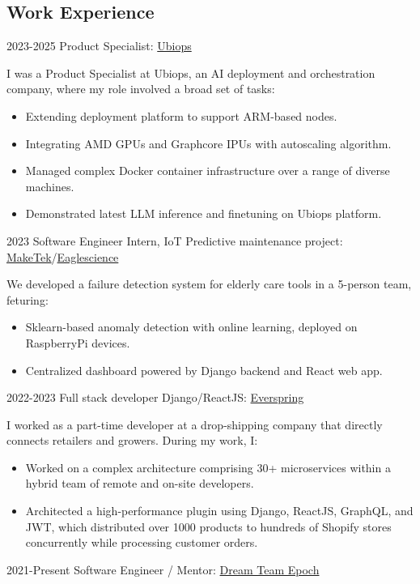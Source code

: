 \documentclass{article}
\begin{document}
\subsection{Work Experience}

\cvitem
{2023-2025}
{Product Specialist:}
{ \href{https://ubiops.com/}{Ubiops}}
{
I was a Product Specialist at Ubiops, an AI deployment and orchestration company, where my role involved a broad set of tasks: 
\begin{itemize}
\item Extending deployment platform to support ARM-based nodes. 
\item Integrating AMD GPUs and Graphcore IPUs with autoscaling algorithm. 
\item Managed complex Docker container infrastructure over a range of diverse machines. 
\item Demonstrated latest LLM inference and finetuning on Ubiops platform.
\end{itemize}
}
\cvitem
{2023}
{Software Engineer Intern, IoT Predictive maintenance project:}
{ \href{https://www.maketek.nl/}{MakeTek}/\href{https://www.eaglescience.nl/}{Eaglescience}}
{We developed a failure detection system for elderly care tools in a 5-person team, feturing:
\begin{itemize}
\item Sklearn-based anomaly detection with online learning, deployed on RaspberryPi devices.
\item Centralized dashboard powered by Django backend and React web app.
\end{itemize}
}
\cvitem
{2022-2023}
{Full stack developer Django/ReactJS:}
{ \href{https://everspring.app/nl/home}{Everspring}}
{I worked as a part-time developer at a drop-shipping company that directly connects retailers and growers. During my work, I:
\begin{itemize}
    \item Worked on a complex architecture comprising 30+ microservices within a hybrid team of remote and on-site developers.
    \item Architected a high-performance plugin using Django, ReactJS, GraphQL, and JWT, which distributed over 1000 products to hundreds of Shopify stores concurrently while processing customer orders.
\end{itemize}}
\cvitem
{2021-Present}
{Software Engineer / Mentor:}
{ \href{https://www.teamepoch.net/}{Dream Team Epoch}}
\end{document}
